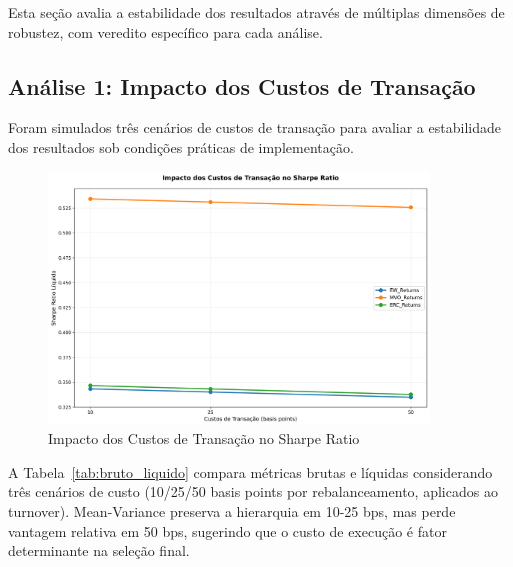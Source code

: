 Esta seção avalia a estabilidade dos resultados através de múltiplas dimensões de robustez, com veredito específico para cada análise.

\subsection{Análise 1: Impacto dos Custos de Transação}

Foram simulados três cenários de custos de transação para avaliar a estabilidade dos resultados sob condições práticas de implementação.

\begin{figure}[H]
\centering
\includegraphics[width=0.9\textwidth]{robustez/impacto_custos_sharpe.png}
\caption{Impacto dos Custos de Transação no Sharpe Ratio}
\label{fig:custos_transacao}
\end{figure}

A Tabela~\ref{tab:bruto_liquido} compara métricas brutas e líquidas considerando três cenários de custo (10/25/50 basis points por rebalanceamento, aplicados ao turnover). Mean-Variance preserva a hierarquia em 10-25 bps, mas perde vantagem relativa em 50 bps, sugerindo que o custo de execução é fator determinante na seleção final.


